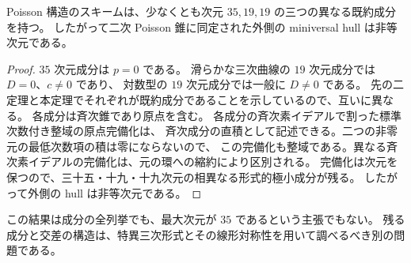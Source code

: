 \begin{corollary}
\label{cor:non-equidimensional-v31}
Poisson 構造のスキームは、少なくとも次元 $35,19,19$ の三つの異なる既約成分を持つ。
したがって二次 Poisson 錐に同定された外側の miniversal hull は非等次元である。
\end{corollary}

\begin{proof}
$35$ 次元成分は $p=0$ である。
滑らかな三次曲線の $19$ 次元成分では $D=0$、$c\neq0$ であり、
対数型の $19$ 次元成分では一般に $D\neq0$ である。
先の二定理と本定理でそれぞれが既約成分であることを示しているので、互いに異なる。
各成分は斉次錐であり原点を含む。
各成分の斉次素イデアルで割った標準次数付き整域の原点完備化は、
斉次成分の直積として記述できる。二つの非零元の最低次数項の積は零にならないので、
この完備化も整域である。異なる斉次素イデアルの完備化は、元の環への縮約により区別される。
完備化は次元を保つので、三十五・十九・十九次元の相異なる形式的極小成分が残る。
したがって外側の hull は非等次元である。
\end{proof}

この結果は成分の全列挙でも、最大次元が $35$ であるという主張でもない。
残る成分と交差の構造は、特異三次形式とその線形対称性を用いて調べるべき別の問題である。
